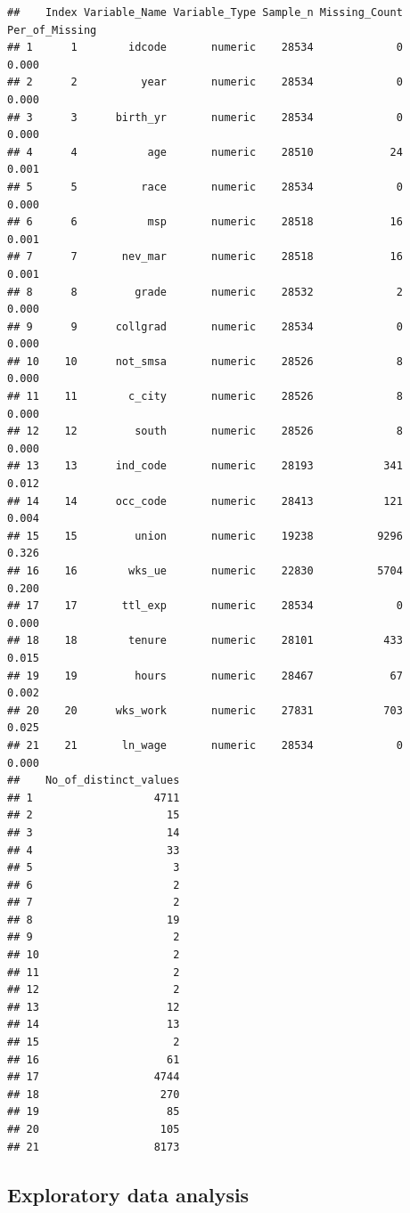 \documentclass[
]{article}
\begin{document}
\begin{verbatim}
##    Index Variable_Name Variable_Type Sample_n Missing_Count Per_of_Missing
## 1      1        idcode       numeric    28534             0          0.000
## 2      2          year       numeric    28534             0          0.000
## 3      3      birth_yr       numeric    28534             0          0.000
## 4      4           age       numeric    28510            24          0.001
## 5      5          race       numeric    28534             0          0.000
## 6      6           msp       numeric    28518            16          0.001
## 7      7       nev_mar       numeric    28518            16          0.001
## 8      8         grade       numeric    28532             2          0.000
## 9      9      collgrad       numeric    28534             0          0.000
## 10    10      not_smsa       numeric    28526             8          0.000
## 11    11        c_city       numeric    28526             8          0.000
## 12    12         south       numeric    28526             8          0.000
## 13    13      ind_code       numeric    28193           341          0.012
## 14    14      occ_code       numeric    28413           121          0.004
## 15    15         union       numeric    19238          9296          0.326
## 16    16        wks_ue       numeric    22830          5704          0.200
## 17    17       ttl_exp       numeric    28534             0          0.000
## 18    18        tenure       numeric    28101           433          0.015
## 19    19         hours       numeric    28467            67          0.002
## 20    20      wks_work       numeric    27831           703          0.025
## 21    21       ln_wage       numeric    28534             0          0.000
##    No_of_distinct_values
## 1                   4711
## 2                     15
## 3                     14
## 4                     33
## 5                      3
## 6                      2
## 7                      2
## 8                     19
## 9                      2
## 10                     2
## 11                     2
## 12                     2
## 13                    12
## 14                    13
## 15                     2
## 16                    61
## 17                  4744
## 18                   270
## 19                    85
## 20                   105
## 21                  8173
\end{verbatim}

\hypertarget{exploratory-data-analysis}{%
\subsection{Exploratory data analysis}\label{exploratory-data-analysis}}
\end{document}
